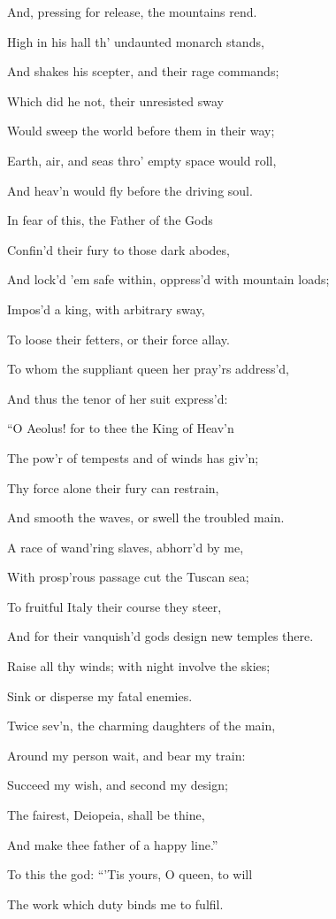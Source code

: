 And, pressing for release, the mountains rend.

High in his hall th’ undaunted monarch stands,

And shakes his scepter, and their rage commands;

Which did he not, their unresisted sway

Would sweep the world before them in their way;

Earth, air, and seas thro’ empty space would roll,

And heav’n would fly before the driving soul.

In fear of this, the Father of the Gods

Confin’d their fury to those dark abodes,

And lock’d ’em safe within, oppress’d with mountain loads;

Impos’d a king, with arbitrary sway,

To loose their fetters, or their force allay.

To whom the suppliant queen her pray’rs address’d,

And thus the tenor of her suit express’d:

“O Aeolus! for to thee the King of Heav’n

The pow’r of tempests and of winds has giv’n;

Thy force alone their fury can restrain,

And smooth the waves, or swell the troubled main.

A race of wand’ring slaves, abhorr’d by me,

With prosp’rous passage cut the Tuscan sea;

To fruitful Italy their course they steer,

And for their vanquish’d gods design new temples there.

Raise all thy winds; with night involve the skies;

Sink or disperse my fatal enemies.

Twice sev’n, the charming daughters of the main,

Around my person wait, and bear my train:

Succeed my wish, and second my design;

The fairest, Deiopeia, shall be thine,

And make thee father of a happy line.”

To this the god: “’Tis yours, O queen, to will

The work which duty binds me to fulfil.

